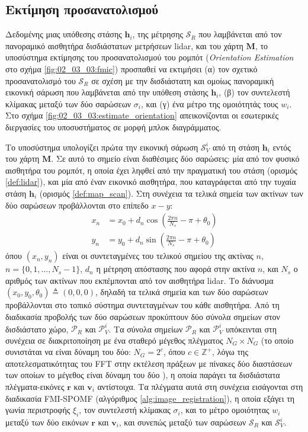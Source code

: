 \subsection{Εκτίμηση προσανατολισμού}
\label{subsection:02_03_03:02}

Δεδομένης μιας υπόθεσης στάσης $\bm{h}_i$, της μέτρησης $\mathcal{S}_R$ που
λαμβάνεται από τον πανοραμικό αισθητήρα δισδιάστατων μετρήσεων lidar, και του
χάρτη $\bm{M}$, το υποσύστημα εκτίμησης του προσανατολισμού του ρομπότ
(\textit{Orientation Estimation} στο σχήμα \ref{fig:02_03_03:fmic}) προσπαθεί να
εκτιμήσει (α) τον σχετικό προσανατολισμό του $\mathcal{S}_R$ σε σχέση με την
δισδιάστατη και ομοίως πανοραμική εικονική σάρωση που λαμβάνεται από την
υπόθεση στάσης $\bm{h}_i$, (β) τον συντελεστή κλίμακας μεταξύ των δύο σαρώσεων
$\sigma_i$, και (γ) ένα μέτρο της ομοιότητάς τους $w_i$.  Στο σχήμα
\ref{fig:02_03_03:estimate_orientation} απεικονίζονται οι εσωτερικές διεργασίες
του υποσυστήματος σε μορφή μπλοκ διαγράμματος.

Το υποσύστημα υπολογίζει πρώτα την εικονική σάρωση $\mathcal{S}_V^i$ από τη
στάση $\bm{h}_i$ εντός του χάρτη $\bm{M}$. Σε αυτό το σημείο είναι διαθέσιμες
δύο σαρώσεις: μία από τον φυσικό αισθητήρα του ρομπότ, η οποία έχει ληφθεί από
την πραγματική του στάση (ορισμός \ref{def:lidar}), και μία από έναν εικονικό
αισθητήρα, που καταγράφεται από την τυχαία στάση $\bm{h}_i$ (ορισμός
\ref{def:map_scan}). Στη συνέχεια τα τελικά σημεία των ακτίνων των δύο σαρώσεων
προβάλλονται στο επίπεδο $x-y$:
\begin{align}
  x_n &= x_0 + d_n \cos(\frac{2 \pi n}{N_s} - \pi + \theta_0) \label{eq:point_projection_x} \\
  y_n &= y_0 + d_n \sin(\frac{2 \pi n}{N_s} - \pi + \theta_0) \label{eq:point_projection_y}
\end{align}
όπου $(x_n,y_n)$ είναι οι συντεταγμένες του τελικού σημείου της ακτίνας $n$, $n
= \{0,1,\dots, N_s-1\}$, $d_n$ η μέτρηση απόστασης που αφορά στην ακτίνα $n$,
και $N_s$ ο αριθμός των ακτίνων που εκπέμπονται από τον αισθητήρα lidar.  Το
διάνυσμα $(x_0,y_0,\theta_0) \triangleq (0,0,0)$, δηλαδή τα τελικά σημεία και
των δύο σαρώσεων προβάλλονται στο τοπικό σύστημα συντεταγμένων του κάθε
αισθητήρα.  Από τη διαδικασία προβολής των δύο σαρώσεων προκύπτουν δύο σύνολα
σημείων στον δισδιάστατο χώρο, $\mathcal{P}_R$ και $\mathcal{P}_V^i$.  Τα
σύνολα σημείων $\mathcal{P}_R$ και $\mathcal{P}_V^i$ υπόκεινται στη συνέχεια σε
διακριτοποίηση με ένα σταθερό μέγεθος πλέγματος $N_G \times N_G$ (το οποίο
συνιστάται να είναι δύναμη του δύο: $N_G = 2^c$, όπου $c \in \mathbb{Z}^{+}$,
λόγω της αποτελεσματικότητας του FFT στην εκτέλεση πράξεων με πίνακες δύο
διαστάσεων των οποίων το μέγεθος είναι δύναμη του δύο \cite{Bulow2010}), η
οποία παράγει τα δισδιάστατα πλέγματα-εικόνες $\bm{r}$ και $\bm{v}_i$
αντίστοιχα. Τα πλέγματα αυτά στη συνέχεια εισάγονται στη διαδικασία FMI-SPOMF
(αλγόριθμος \ref{alg:image_registration}), η οποία εξάγει τη γωνία περιστροφής
$\xi_i$, τον συντελεστή κλίμακας $\sigma_i$, και το μέτρο ομοιότητας $w_i$
μεταξύ των δύο εικόνων $\bm{r}$ και $\bm{v}_i$, και συνεπώς μεταξύ των σαρώσεων
$\mathcal{S}_R$ και $\mathcal{S}_V^i$.


